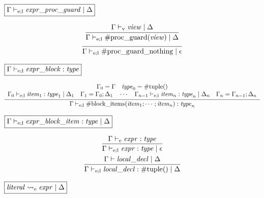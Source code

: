 $\fbox{$\Gamma \vdash_{\mathrm{e}; \mathrm{l}} \mathit{expr\_proc\_guard} \mid \Delta$}$

\begin{gather*}
    \infer{\Gamma \vdash_{\mathrm{e}; \mathrm{l}} \mathrm{\#proc\_guard}(\mathit{view}) \mid \Delta}{
        \Gamma \vdash_\mathrm{v} \mathit{view} \mid \Delta
    }
    \\
    \infer{\Gamma \vdash_{\mathrm{e}; \mathrm{l}} \mathrm{\#proc\_guard\_nothing} \mid \epsilon}{}
\end{gather*}

$\fbox{$\Gamma \vdash_{\mathrm{e}; \mathrm{l}} \mathit{expr\_block}: \mathit{type}$}$

\begin{gather*}
    \infer{\Gamma \vdash_{\mathrm{e}; \mathrm{l}} \mathrm{\#block\_items}(\mathit{item}_1; \cdots; \mathit{item}_n): \mathit{type}_n}{
        \begin{array}{c}
            \Gamma_0 = \Gamma
            \hspace{1em}
            \mathit{type}_0 = \mathrm{\#tuple}()
            \\
            \Gamma_0 \vdash_{\mathrm{e}; \mathrm{l}} \mathit{item}_1: \mathit{type}_1 \mid \Delta_1
            \hspace{1em}
            \Gamma_1 = \Gamma_0; \Delta_1
            \hspace{1em}
            \cdots
            \hspace{1em}
            \Gamma_{n - 1} \vdash_{\mathrm{e}; \mathrm{l}} \mathit{item}_n: \mathit{type}_n \mid \Delta_n
            \hspace{1em}
            \Gamma_n = \Gamma_{n - 1}; \Delta_n
        \end{array}
    }
\end{gather*}

$\fbox{$\Gamma \vdash_{\mathrm{e}; \mathrm{l}} \mathit{expr\_block\_item}: \mathit{type} \mid \Delta$}$

\begin{gather*}
    \infer{\Gamma \vdash_{\mathrm{e}; \mathrm{l}} \mathit{expr}: \mathit{type} \mid \epsilon}{
        \Gamma \vdash_\mathrm{e} \mathit{expr}: \mathit{type}
    }
    \\
    \infer{\Gamma \vdash_{\mathrm{e}; \mathrm{l}} \mathit{local\_decl}: \mathrm{\#tuple}() \mid \Delta}{
        \Gamma \vdash \mathit{local\_decl} \mid \Delta
    }
\end{gather*}

$\fbox{$\mathit{literal} \rightsquigarrow_\mathrm{e} \mathit{expr} \mid \Delta$}$

